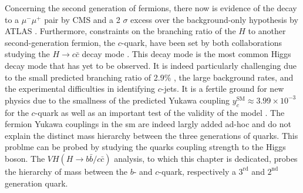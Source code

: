 Concerning the second generation of fermions, there now is evidence of the decay to a $\mu^-\mu^+$ pair by CMS \cite{CMS:2020xwi} and a 2 $\sigma$ excess over the background-only hypothesis by ATLAS \cite{ATLAS:2020fzp}. Furthermore, constraints on the branching ratio of the $H$ to another second-generation fermion, the $c$-quark, have been set by both collaborations studying the $H \rightarrow c\bar{c}$ decay mode \cite{Aaboud:2018fhh}. This decay mode is the most common Higgs decay mode that has yet to be observed. It is indeed particularly challenging due to the small predicted branching ratio of 2.9\% \cite{DJOUADI199856}, the large background rates, and the experimental difficulties in identifying $c$-jets. It is a fertile ground for new physics  due to the smallness of the predicted Yukawa coupling $y^{\textrm{SM}}_c \approx 3.99 \times 10^{-3} $ \cite{yukawac} for the $c$-quark as well as an important test of the validity of the model \cite{PhysRevD.89.033014, PhysRevD.92.033016, Botella:2016krk, PhysRevD.98.055001, GHOSH2016504, PhysRevLett.123.031802, PhysRevD.100.115041}. The fermion Yukawa couplings in the \gls{sm} are indeed largly added ad-hoc and do not explain the distinct mass hierarchy between the three generations of quarks. This problme can be probed by studying the quarks coupling strength to the Higgs boson. The $VH (H \rightarrow b\bar{b}/c\bar{c})$ analysis, to which this chapter is dedicated, probes the hierarchy of mass between the $b$- and $c$-quark, respectively a $3^{\textrm{rd}}$ and $2^{\textrm{nd}}$ generation quark.

